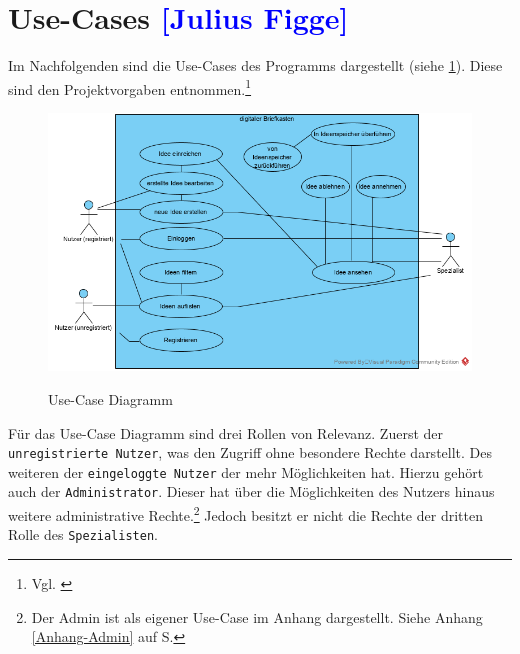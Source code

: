 

\section{Use-Cases  \textcolor{blue}{[Julius Figge]}}

Im Nachfolgenden sind die Use-Cases des Programms dargestellt (siehe \cref{fig:usecases}).
Diese sind den Projektvorgaben entnommen.\footnote{Vgl. \cite{Vorgaben2020}}

\begin{figure}[hbt]
    \label{usecase}
    \centering
    \begin{minipage}[t]{1\textwidth}
        \caption{Use-Case Diagramm}
        \includegraphics[width=1\textwidth]{img/createAnAccountWithSpamMailAccountYouSucker.png}\\
        \label{fig:usecases}
    \end{minipage}
\end{figure}

Für das Use-Case Diagramm sind drei Rollen von Relevanz.
Zuerst der \texttt{unregistrierte Nutzer}, was den Zugriff ohne besondere Rechte darstellt.
Des weiteren der \texttt{eingeloggte Nutzer} der mehr Möglichkeiten hat. Hierzu gehört auch der \texttt{Administrator}.
Dieser hat über die Möglichkeiten des Nutzers hinaus weitere administrative Rechte.\footnote{Der Admin ist als eigener Use-Case im Anhang dargestellt. Siehe Anhang \ref{Anhang-Admin} auf S.\pageref{Anhang-Admin}}
Jedoch besitzt er nicht die Rechte der dritten Rolle des \texttt{Spezialisten}.\\

